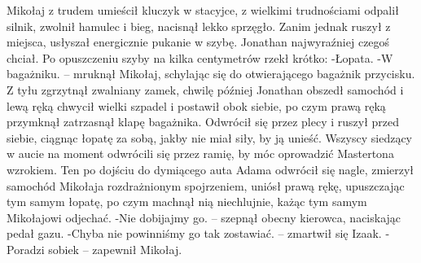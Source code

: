 \documentclass[../MAIN.tex]{subfiles}
\begin{document}
Mikołaj z trudem umieścił kluczyk w stacyjce, z wielkimi trudnościami odpalił silnik, zwolnił hamulec i bieg, nacisnął lekko sprzęgło. Zanim jednak ruszył z miejsca, usłyszał energicznie pukanie w szybę. Jonathan najwyraźniej czegoś chciał. Po opuszczeniu szyby na kilka centymetrów rzekł krótko:
-Łopata.
-W bagażniku. -- mruknął Mikołaj, schylając się do otwierającego bagażnik przycisku. Z tyłu zgrzytnął zwalniany zamek, chwilę później Jonathan obszedł samochód i lewą ręką chwycił wielki szpadel i postawił obok siebie, po czym prawą ręką przymknął zatrzasnął klapę bagażnika. Odwrócił się przez plecy i ruszył przed siebie, ciągnąc łopatę za sobą, jakby nie miał siły, by ją unieść.
Wszyscy siedzący w aucie na moment odwrócili się przez ramię, by móc oprowadzić Mastertona wzrokiem. Ten po dojściu do dymiącego auta Adama odwrócił się nagle, zmierzył samochód Mikołaja rozdrażnionym spojrzeniem, uniósł prawą rękę, upuszczając tym samym łopatę, po czym machnął nią niechlujnie, każąc tym samym Mikołajowi odjechać.
-Nie dobijajmy go. -- szepnął obecny kierowca, naciskając pedał gazu.
-Chyba nie powinniśmy go tak zostawiać. -- zmartwił się Izaak.
-Poradzi sobie\3k -- zapewnił Mikołaj.
\end{document}
